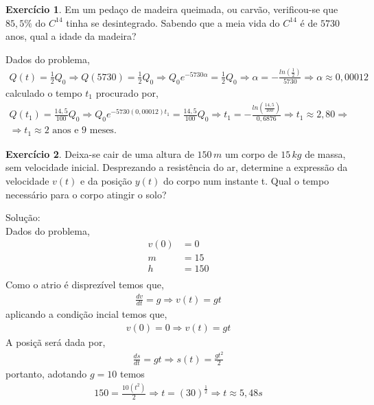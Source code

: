 \documentclass[a4paper,12pt,reqno,natbib]{amsart}
\theoremstyle{definition}
\newtheorem{exercise}{Exerc\'icio}
\begin{document}
\vspace{0.6 cm}

\begin{exercise}
Em um pedaço de madeira queimada, ou carvão, verificou-se que $85,5\%$ do $C^{14}$ tinha se desintegrado. Sabendo que a meia vida do $C^{14}$ é de $5730$ anos, qual a idade da madeira?
\end{exercise}
Dados do problema,
\begin{align*}
	Q(t) = \frac{1}{2}Q_0 \Rightarrow Q(5730) = \frac{1}{2}Q_0 \Rightarrow Q_0 e^{-5730\alpha} = \frac{1}{2}Q_0 \Rightarrow \alpha =
	-\frac{ln(\frac{1}{2})}{5730} \Rightarrow \alpha \approx 0,00012
\end{align*}
calculado o tempo $t_1$ procurado por,
\begin{align*}
	Q(t_1) = \frac{14,5}{100}Q_0 \Rightarrow  Q_0 e^{-5730(0,00012) t_1} = \frac{14,5}{100} Q_0 \Rightarrow t_1 =
	-\frac{ln(\frac{14,5}{100})}{0,6876} \Rightarrow t_1 \approx 2,80 \Rightarrow \\
	\Rightarrow \boxed{t_1 \approx \mbox{2 anos e 9 meses.}}
\end{align*}

\vspace{0.7 cm}

\begin{center}
\end{center}

\vspace{0.7 cm}

\begin{exercise}
Deixa-se cair de uma altura de $150\,m$ um corpo de $15\,kg$ de massa, sem velocidade inicial. Desprezando a resistência do ar, determine a expressão da velocidade $v(t)$ e da posição $y(t)$ do corpo num instante t. Qual o tempo necessário para o corpo atingir o solo?	
\end{exercise}
Solu\c c\~ao:\\
Dados do problema,
\begin{align*}
	v(0) &= 0\\
	m & = 15 \\
	 h & = 150\\
\end{align*}
Como o atrio \'e disprez\'ivel temos que,
\begin{align*}
	\frac{dv}{dt} = g \Rightarrow v(t)  = gt 
\end{align*}
aplicando a condi\c c\~ao incial temos que,
\begin{align*}
	v(0) = 0 \Rightarrow v(t) = gt 
\end{align*}
A posi\c c\~a ser\'a dada por,
\begin{align*}
	\frac{ds}{dt} = gt \Rightarrow s(t) = \frac{gt^{2}}{2}
\end{align*}
portanto, adotando $g = 10$ temos 
\begin{align*}
	150 = \frac{10(t^{{2}})}{2} \Rightarrow t = (30)^{\frac{1}{2}}  \Rightarrow t \approx 5,48s
\end{align*}
\vspace{0.6 cm}
\end{document}
